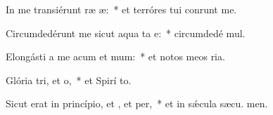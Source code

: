 \item In me transiérunt ræ æ:~* et terróres tui conrunt me.
\item Circumdedérunt me sicut aqua ta e:~* circumdedé  mul.
\item Elongásti a me acum et mum:~* et notos meos  ria.
\item Glória tri, et o,~* et Spirí to.
\item Sicut erat in princípio, et , et per,~* et in sǽcula sæcu. men.
